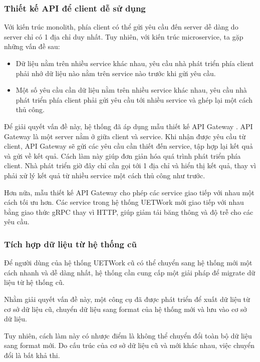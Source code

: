 \documentclass[./../main.tex]{subfiles}
\begin{document}
\hypertarget{thiux1ebft-kux1ebf-api-ux111ux1ec3-client-dux1ec5-sux1eed-dux1ee5ng}{%
\subsubsection{Thiết kế API để client dễ sử
dụng}\label{thiux1ebft-kux1ebf-api-ux111ux1ec3-client-dux1ec5-sux1eed-dux1ee5ng}}

Với kiến trúc monolith, phía client có thể gửi yêu cầu đến server dễ
dàng do server chỉ có 1 địa chỉ duy nhất. Tuy nhiên, với kiến trúc
microservice, ta gặp những vấn đề sau:

\begin{itemize}
\item
  
  Dữ liệu nằm trên nhiều service khác nhau, yêu cầu nhà phát triển phía
  client phải nhớ dữ liệu nào nằm trên service nào trước khi gửi yêu
  cầu.
  
\item
  
  Một số yêu cầu cần dữ liệu nằm trên nhiều service khác nhau, yêu cầu
  nhà phát triển phía client phải gửi yêu cầu tới nhiều service và ghép
  lại một cách thủ công.
  
\end{itemize}

Để giải quyết vấn đề này, hệ thống đã áp dụng mẫu thiết kế API Gateway \cite{Ric22}. API Gateway là một server nằm ở giữa client và service. Khi nhận được yêu cầu từ client, API Gateway sẽ gửi các yêu cầu cần thiết đến service, tập hợp lại kết quả và gửi về kết quả. Cách làm này giúp đơn giản hóa quá trình phát triển phía client. Nhà phát triển giờ đây chỉ cần gọi tới 1 địa chỉ và hiển thị kết quả, thay vì phải xử lý kết quả từ nhiều service một cách thủ công như trước.

Hơn nữa, mẫu thiết kế API Gateway cho phép các service giao tiếp với nhau một cách tối ưu hơn. Các service trong hệ thống UETWork mới giao tiếp với nhau bằng giao thức gRPC thay vì HTTP, giúp giảm tải băng thông và độ trễ cho các yêu cầu.

\subsubsection{Tích hợp dữ liệu từ hệ thống cũ}

Để người dùng của hệ thống UETWork cũ có thể chuyển sang hệ thống mới một cách nhanh và dễ dàng nhất, hệ thống cần cung cấp một giải pháp để migrate dữ liệu từ hệ thống cũ.

Nhằm giải quyết vấn đề này, một công cụ đã được phát triển để xuất dữ liệu từ cơ sở dữ liệu cũ, chuyển dữ liệu sang format của hệ thống mới và lưu vào cơ sở dữ liệu.

Tuy nhiên, cách làm này có nhược điểm là không thể chuyển đổi toàn bộ dữ liệu sang format mới. Do cấu trúc của cơ sở dữ liệu cũ và mới khác nhau, việc chuyển đổi là bất khả thi.
\end{document}
